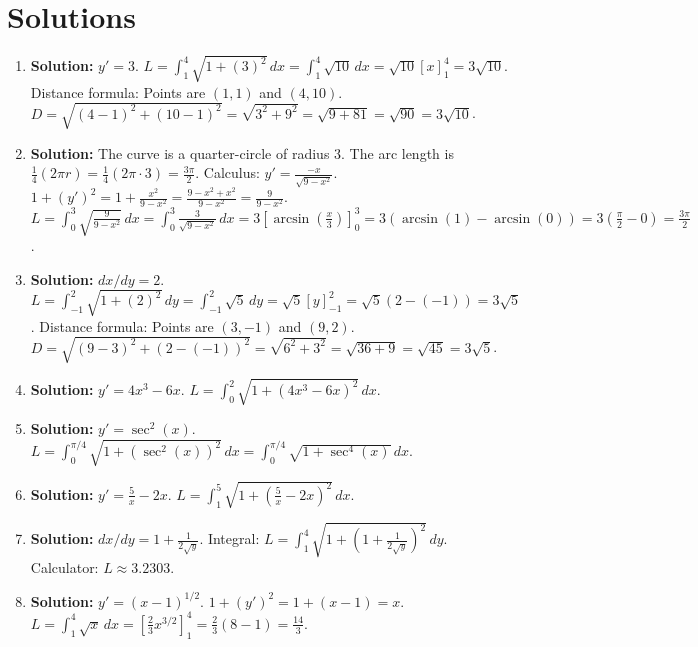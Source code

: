 \documentclass[12pt]{article}
\begin{document}
\section*{Solutions}
\begin{enumerate}
    \item \textbf{Solution:} $y' = 3$. $L = \int_1^4 \sqrt{1 + (3)^2} \,dx = \int_1^4 \sqrt{10} \,dx = \sqrt{10}[x]_1^4 = 3\sqrt{10}$.
    Distance formula: Points are $(1,1)$ and $(4,10)$. $D = \sqrt{(4-1)^2 + (10-1)^2} = \sqrt{3^2 + 9^2} = \sqrt{9+81} = \sqrt{90} = 3\sqrt{10}$.
    
    \item \textbf{Solution:} The curve is a quarter-circle of radius 3. The arc length is $\frac{1}{4}(2\pi r) = \frac{1}{4}(2\pi \cdot 3) = \frac{3\pi}{2}$.
    Calculus: $y' = \frac{-x}{\sqrt{9-x^2}}$. $1+(y')^2 = 1 + \frac{x^2}{9-x^2} = \frac{9-x^2+x^2}{9-x^2} = \frac{9}{9-x^2}$.
    $L = \int_0^3 \sqrt{\frac{9}{9-x^2}} \,dx = \int_0^3 \frac{3}{\sqrt{9-x^2}} \,dx = 3[\arcsin(\frac{x}{3})]_0^3 = 3(\arcsin(1) - \arcsin(0)) = 3(\frac{\pi}{2}-0) = \frac{3\pi}{2}$.

    \item \textbf{Solution:} $dx/dy = 2$. $L = \int_{-1}^2 \sqrt{1+(2)^2} \,dy = \int_{-1}^2 \sqrt{5} \,dy = \sqrt{5}[y]_{-1}^2 = \sqrt{5}(2 - (-1)) = 3\sqrt{5}$.
    Distance formula: Points are $(3,-1)$ and $(9,2)$. $D = \sqrt{(9-3)^2 + (2-(-1))^2} = \sqrt{6^2+3^2} = \sqrt{36+9} = \sqrt{45} = 3\sqrt{5}$.

    \item \textbf{Solution:} $y' = 4x^3 - 6x$. $L = \int_0^2 \sqrt{1 + (4x^3 - 6x)^2} \,dx$.
    
    \item \textbf{Solution:} $y' = \sec^2(x)$. $L = \int_0^{\pi/4} \sqrt{1 + (\sec^2(x))^2} \,dx = \int_0^{\pi/4} \sqrt{1 + \sec^4(x)} \,dx$.
    
    \item \textbf{Solution:} $y' = \frac{5}{x} - 2x$. $L = \int_1^5 \sqrt{1 + (\frac{5}{x} - 2x)^2} \,dx$.
    
    \item \textbf{Solution:} $dx/dy = 1 + \frac{1}{2\sqrt{y}}$. Integral: $L = \int_1^4 \sqrt{1 + (1 + \frac{1}{2\sqrt{y}})^2} \,dy$.
    Calculator: $L \approx 3.2303$.
    
    \item \textbf{Solution:} $y' = (x-1)^{1/2}$. $1+(y')^2 = 1 + (x-1) = x$. $L = \int_1^4 \sqrt{x} \,dx = [\frac{2}{3}x^{3/2}]_1^4 = \frac{2}{3}(8-1) = \frac{14}{3}$.
    

\end{enumerate}
\end{document}
